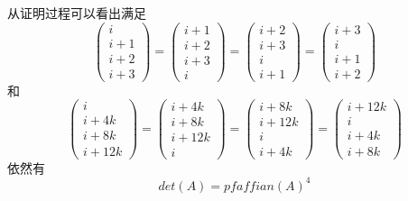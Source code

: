 \documentclass{amsc}          %
\numberwithin{equation}{section} %
\begin{document}
\begin{prof}
\end{prof}
从证明过程可以看出满足$$\begin{pmatrix}i\\i+1\\i+2\\i+3 \end{pmatrix}=\begin{pmatrix}i+1\\i+2\\i+3\\i \end{pmatrix}=\begin{pmatrix}i+2\\i+3\\i\\i+1 \end{pmatrix}=\begin{pmatrix}i+3\\i\\i+1\\i+2 \end{pmatrix}$$和$$\begin{pmatrix}i\\i+4k\\i+8k\\i+12k \end{pmatrix}=\begin{pmatrix}i+4k\\i+8k\\i+12k\\i \end{pmatrix}=\begin{pmatrix}i+8k\\i+12k\\i\\i+4k \end{pmatrix}=\begin{pmatrix}i+12k\\i\\i+4k\\i+8k \end{pmatrix}$$
依然有$$det(A)=pfaffian(A)^{4}$$
\end{document}
